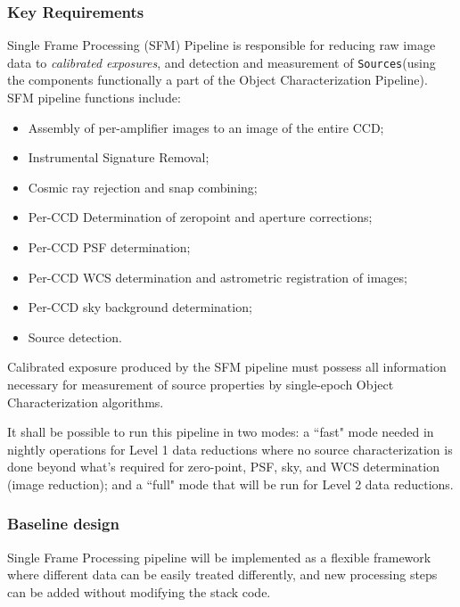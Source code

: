 \documentclass[12pt]{article}
\newcommand{\code}[1]{\texttt{#1}}
\newcommand{\Sources}{\code{Sources}\xspace}
\begin{document}
\subsubsection{Key Requirements}

Single Frame Processing (SFM) Pipeline is responsible for reducing raw image data to \emph{calibrated exposures}, and detection and measurement of \Sources (using the components functionally a part of the Object Characterization Pipeline).
\\

SFM pipeline functions include:
%
\begin{itemize}
    \item Assembly of per-amplifier images to an image of the entire CCD;
    \item Instrumental Signature Removal;
    \item Cosmic ray rejection and snap combining;
    \item Per-CCD Determination of zeropoint and aperture corrections;
    \item Per-CCD PSF determination;
    \item Per-CCD WCS determination and astrometric registration of images;
    \item Per-CCD sky background determination;
    \item Source detection.
\end{itemize}

Calibrated exposure produced by the SFM pipeline must possess all information necessary for measurement of source properties by single-epoch Object Characterization algorithms.

It shall be possible to run this pipeline in two modes: a ``fast" mode needed in nightly operations for Level 1 data reductions where no source characterization is done beyond what's required for zero-point, PSF, sky, and WCS determination (image reduction); and a ``full" mode that will be run for Level 2 data reductions.

\subsubsection{Baseline design}

Single Frame Processing pipeline will be implemented as a flexible framework where different data can be easily treated differently, and new processing steps can be added without modifying the stack code.
\\
\end{document}
